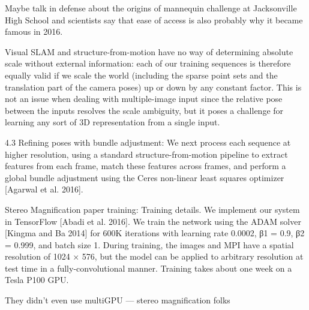 Maybe talk in defense about the origins of mannequin challenge at Jacksonville High School and scientists say that ease of access is also probably why it became famous in 2016.

Visual SLAM and structure-from-motion have no way of determining absolute scale without external information: each of our training sequences is therefore equally valid if we scale the world (including the sparse point sets and the translation part of the camera poses) up or down by any constant factor. This is not an issue when dealing with multiple-image input since the relative pose between the inputs resolves the scale ambiguity, but it poses a challenge for learning any sort of 3D representation from a single input.

4.3 Refining poses with bundle adjustment: 
We next process each sequence at higher resolution, using a standard structure-from-motion pipeline to extract features from each frame, match these features across frames, and perform a global bundle adjustment using the Ceres non-linear least squares optimizer [Agarwal et al. 2016].

Stereo Magnification paper training:
Training details. We implement our system in TensorFlow [Abadi et al. 2016]. We train the network using the ADAM solver [Kingma and Ba 2014] for 600K iterations with learning rate 0.0002, β1 = 0.9, β2 = 0.999, and batch size 1. During training, the images and MPI have a spatial resolution of 1024 × 576, but the model can be applied to arbitrary resolution at test time in a fully-convolutional manner. Training takes about one week on a Tesla P100 GPU.

They didn't even use multiGPU — stereo magnification folks